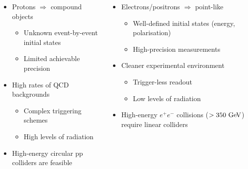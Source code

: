 \begin{frame}
  \vspace{-0.3cm}

  \begin{columns}[t]

    \begin{itemize}
    \item Protons $\Rightarrow$ compound objects
      \begin{itemize}
      \item Unknown event-by-event initial states
      \item Limited achievable precision
      \end{itemize}
    \item High rates of QCD backgrounds
      \begin{itemize}
      \item Complex triggering schemes
      \item High levels of radiation
      \end{itemize}
    \item High-energy circular pp colliders are feasible
    \end{itemize}


    \begin{itemize}
    \item Electrons/positrons $\Rightarrow$ point-like
      \begin{itemize}
      \item Well-defined initial states (energy, polarisation)
      \item High-precision measurements
      \end{itemize}
    \item Cleaner experimental environment
      \begin{itemize}
      \item Trigger-less readout
      \item Low levels of radiation
      \end{itemize}
    \item High-energy $e^+e^-$ collisions ($>350\,\mathrm{\,Ge\kern -0.1em V}$) require
      linear colliders
    \end{itemize}

  \end{columns}

\end{frame}


